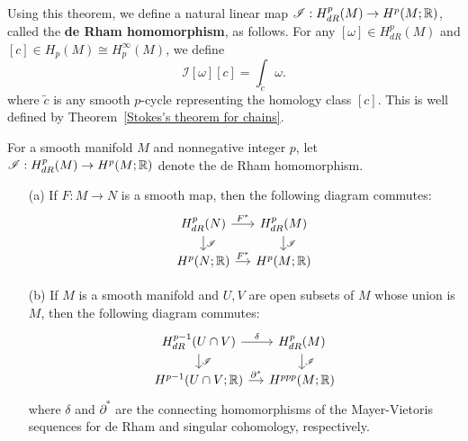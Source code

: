 Using this theorem, we define a natural linear map $\mathscr{I}:H_{dR}^p(M)\to H^p(M;\mathbb{R})$, called the \textbf{de Rham homomorphism}, as follows. For any $[\omega]\in H^p_{dR}(M)$ 
and $[c]\in H_p(M)\cong H_p^{\infty}(M)$, we define
\[\mathscr{I}[\omega][c]=\int_{\widetilde{c}}\omega.\]
where $\widetilde{c}$ is any smooth $p$-cycle representing the homology class $[c]$. This is well defined by Theorem~\ref{Stokes's theorem for chains}.
\begin{proposition}\label{de Rham homomorphism naturality}
For a smooth manifold $M$ and nonnegative integer $p$, let $\mathscr{I}:H^p_{dR}(M)\to H^p(M;\mathbb{R})$ denote the de Rham homomorphism.
\begin{itemize}
\item[(a)] If $F:M\to N$ is a smooth map, then the following diagram commutes:
\[\begin{tikzcd}[row sep=12pt,column sep=12pt]
H_{dR}^p(N)\ar[r,"F^*"]\ar[d,"\mathscr{I}"]&H_{dR}^p(M)\ar[d,"\mathscr{I}"]\\
H^p(N;\R)\ar[r,"F^*"]&H^p(M;\R)
\end{tikzcd}\] 
\item[(b)] If $M$ is a smooth manifold and $U,V$ are open subsets of $M$ whose union is $M$, then the following diagram commutes:
\[
\begin{tikzcd}[row sep=12pt,column sep=12pt]
H_{dR}^{p-1}(U\cap V)\ar[r,"\delta"]\ar[d,"\mathscr{I}"]&H_{dR}^p(M)\ar[d,"\mathscr{I}"]\\
H^{p-1}(U\cap V;\R)\ar[r,"\partial^*"]&H^{ppp}(M;\R)
\end{tikzcd}
\]
where $\delta$ and $\partial^*$ are the connecting homomorphisms of the Mayer-Vietoris sequences for de Rham and singular cohomology, respectively.
\end{itemize}
\end{proposition}
